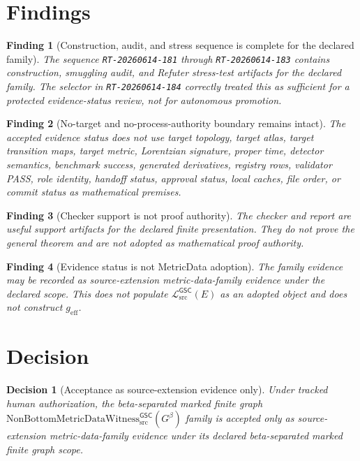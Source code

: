 \documentclass[11pt]{article}
\newcommand{\Witness}{\mathrm{NonBottomMetricDataWitness}_{\mathrm{src}}^{\mathsf{GSC}}}
\newcommand{\Gbeta}{G^{\beta}}
\newcommand{\MetricData}{\mathcal{L}_{\mathrm{src}}^{\mathsf{GSC}}}
\newcommand{\geff}{g_{\mathrm{eff}}}
\newtheorem{decision}{Decision}
\newtheorem{finding}{Finding}
\begin{document}
\section{Findings}

\begin{finding}[Construction, audit, and stress sequence is complete for the declared family]
The sequence \texttt{RT-20260614-181} through \texttt{RT-20260614-183}
contains construction, smuggling audit, and Refuter stress-test artifacts for
the declared family. The selector in \texttt{RT-20260614-184} correctly
treated this as sufficient for a protected evidence-status review, not for
autonomous promotion.
\end{finding}

\begin{finding}[No-target and no-process-authority boundary remains intact]
The accepted evidence status does not use target topology, target atlas,
target transition maps, target metric, Lorentzian signature, proper time,
detector semantics, benchmark success, generated derivatives, registry rows,
validator PASS, role identity, handoff status, approval status, local caches,
file order, or commit status as mathematical premises.
\end{finding}

\begin{finding}[Checker support is not proof authority]
The checker and report are useful support artifacts for the declared finite
presentation. They do not prove the general theorem and are not adopted as
mathematical proof authority.
\end{finding}

\begin{finding}[Evidence status is not MetricData adoption]
The family evidence may be recorded as source-extension metric-data-family
evidence under the declared scope. This does not populate \(\MetricData(E)\)
as an adopted object and does not construct \(\geff\).
\end{finding}

\section{Decision}

\begin{decision}[Acceptance as source-extension evidence only]
Under tracked human authorization, the beta-separated marked finite graph
\(\Witness(\Gbeta)\) family is accepted only as source-extension
metric-data-family evidence under its declared beta-separated marked finite
graph scope.
\end{decision}
\end{document}
